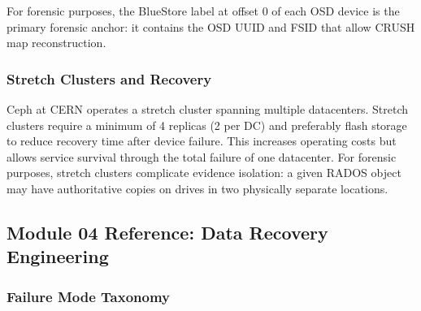 \documentclass[11pt,letterpaper]{article}
\begin{document}
For forensic purposes, the BlueStore label at offset 0 of each OSD device is the primary forensic anchor: it contains the OSD UUID and FSID that allow CRUSH map reconstruction.

\subsubsection{Stretch Clusters and Recovery}

Ceph at CERN operates a stretch cluster spanning multiple datacenters. Stretch clusters require a minimum of 4 replicas (2 per DC) and preferably flash storage to reduce recovery time after device failure. This increases operating costs but allows service survival through the total failure of one datacenter. For forensic purposes, stretch clusters complicate evidence isolation: a given RADOS object may have authoritative copies on drives in two physically separate locations.

\subsection{Module 04 Reference: Data Recovery Engineering}

\subsubsection{Failure Mode Taxonomy}
\end{document}
